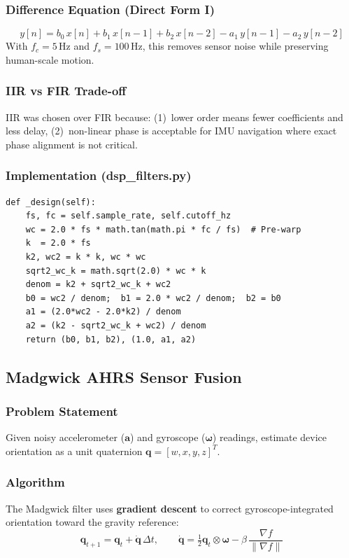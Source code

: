 \documentclass[12pt,a4paper]{article}
\begin{document}
\subsubsection{Difference Equation (Direct Form I)}
\begin{equation}
y[n] = b_0\,x[n] + b_1\,x[n\!-\!1] + b_2\,x[n\!-\!2] - a_1\,y[n\!-\!1] - a_2\,y[n\!-\!2]
\end{equation}
With $f_c = 5$\,Hz and $f_s = 100$\,Hz, this removes sensor noise while preserving human-scale motion.

\subsubsection{IIR vs FIR Trade-off}
IIR was chosen over FIR because: (1)~lower order means fewer coefficients and less delay, (2)~non-linear phase is acceptable for IMU navigation where exact phase alignment is not critical.

\subsubsection{Implementation (dsp\_filters.py)}
\begin{verbatim}
def _design(self):
    fs, fc = self.sample_rate, self.cutoff_hz
    wc = 2.0 * fs * math.tan(math.pi * fc / fs)  # Pre-warp
    k  = 2.0 * fs
    k2, wc2 = k * k, wc * wc
    sqrt2_wc_k = math.sqrt(2.0) * wc * k
    denom = k2 + sqrt2_wc_k + wc2
    b0 = wc2 / denom;  b1 = 2.0 * wc2 / denom;  b2 = b0
    a1 = (2.0*wc2 - 2.0*k2) / denom
    a2 = (k2 - sqrt2_wc_k + wc2) / denom
    return (b0, b1, b2), (1.0, a1, a2)
\end{verbatim}

\subsection{Madgwick AHRS Sensor Fusion}

\subsubsection{Problem Statement}
Given noisy accelerometer ($\mathbf{a}$) and gyroscope ($\boldsymbol{\omega}$) readings, estimate device orientation as a unit quaternion $\mathbf{q} = [w, x, y, z]^T$.

\subsubsection{Algorithm}
The Madgwick filter uses \textbf{gradient descent} to correct gyroscope-integrated orientation toward the gravity reference:
\begin{equation}
\mathbf{q}_{t+1} = \mathbf{q}_t + \dot{\mathbf{q}}\,\Delta t, \qquad
\dot{\mathbf{q}} = \tfrac{1}{2}\mathbf{q}_t \otimes \boldsymbol{\omega} - \beta\,\frac{\nabla f}{\|\nabla f\|}
\end{equation}
\end{document}
